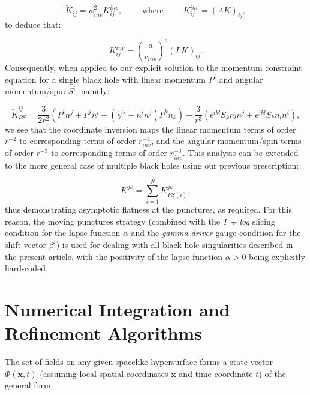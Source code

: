 \documentclass{article}
\begin{document}
\begin{equation}
\tilde{K}_{i j} = \psi_{inv}^{2} K_{i j}^{inv}, \qquad \text{ where } \qquad K_{i j}^{inv} = \left( \Lambda K \right)_{i j},
\end{equation}
to deduce that:

\begin{equation}
K_{i j}^{inv} = \left( \frac{a}{r_{inv}} \right)^6 \left( L K \right)_{i j}.
\end{equation}
Consequently, when applied to our explicit solution to the momentum constraint equation for a single black hole with linear momentum ${P^i}$ and angular momentum/spin ${S^i}$, namely:

\begin{equation}
\tilde{K}_{PS}^{i j} = \frac{3}{2 r^2} \left( P^i n^j + P^j n^i - \left( \tilde{\gamma}^{i j} - n^i n^j \right) P^k n_k \right) + \frac{3}{r^3} \left( \epsilon^{i k l} S_k n_l n^j + \epsilon^{j k l} S_k n_l n^i \right),
\end{equation}
we see that the coordinate inversion maps the linear momentum terms of order ${r^{-2}}$ to corresponding terms of order ${r_{inv}^{-4}}$, and the angular momentum/spin terms of order ${r^{-3}}$ to corresponding terms of order ${r_{inv}^{-3}}$. This analysis can be extended to the more general case of multiple black holes using our previous prescription:

\begin{equation}
K^{j k} = \sum_{i = 1}^{N} K_{PS \left( i \right)}^{j k},
\end{equation}
thus demonstrating asymptotic flatness at the punctures, as required. For this reason, the moving punctures strategy (combined with the \textit{1 + log} slicing condition for the lapse function ${\alpha}$ and the \textit{gamma-driver} gauge condition for the shift vector ${\beta^i}$) is used for dealing with all black hole singularities described in the present article, with the positivity of the lapse function ${\alpha > 0}$ being explicitly hard-coded.

\section{Numerical Integration and Refinement Algorithms}
\label{sec:Section3}

The set of fields on any given spacelike hypersurface forms a state vector ${\Phi \left( \mathbf{x}, t \right)}$ (assuming local spatial coordinates ${\mathbf{x}}$ and time coordinate $t$) of the general form:
\end{document}
